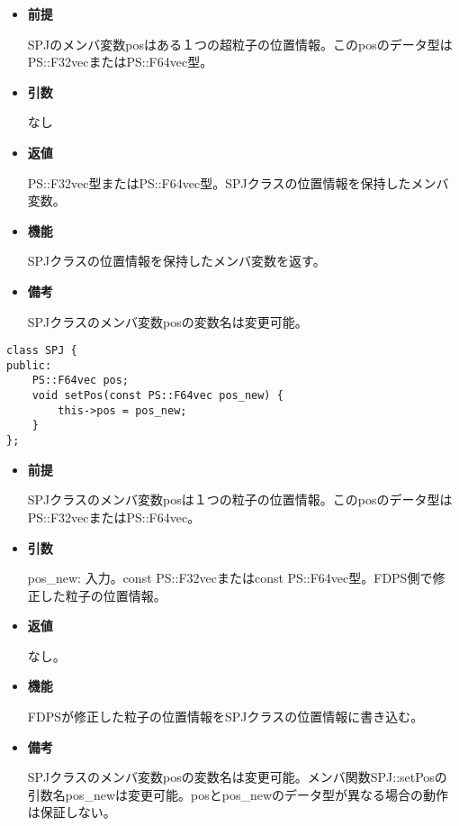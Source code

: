 \begin{itemize}

\item {\bf 前提}
  
  SPJのメンバ変数posはある１つの超粒子の位置情報。このposのデータ型は
  PS::F32vecまたはPS::F64vec型。
  
\item {\bf 引数}

  なし
  
\item {\bf 返値}

  PS::F32vec型またはPS::F64vec型。SPJクラスの位置情報を保持したメンバ
  変数。
  
\item {\bf 機能}

  SPJクラスの位置情報を保持したメンバ変数を返す。
  
\item {\bf 備考}

  SPJクラスのメンバ変数posの変数名は変更可能。

\end{itemize}


\begin{screen}
\begin{verbatim}
class SPJ {
public:
    PS::F64vec pos;
    void setPos(const PS::F64vec pos_new) {
        this->pos = pos_new;
    }
};
\end{verbatim}
\end{screen}

\begin{itemize}

\item {\bf 前提}
  
  SPJクラスのメンバ変数posは１つの粒子の位置情報。このposのデータ型は
  PS::F32vecまたはPS::F64vec。

\item {\bf 引数}

  pos\_new: 入力。const PS::F32vecまたはconst PS::F64vec型。FDPS側で修
  正した粒子の位置情報。

\item {\bf 返値}

  なし。
  
\item {\bf 機能}

  FDPSが修正した粒子の位置情報をSPJクラスの位置情報に書き込む。

\item {\bf 備考}

  SPJクラスのメンバ変数posの変数名は変更可能。メンバ関数SPJ::setPosの
  引数名pos\_newは変更可能。posとpos\_newのデータ型が異なる場合の動作
  は保証しない。

\end{itemize}

